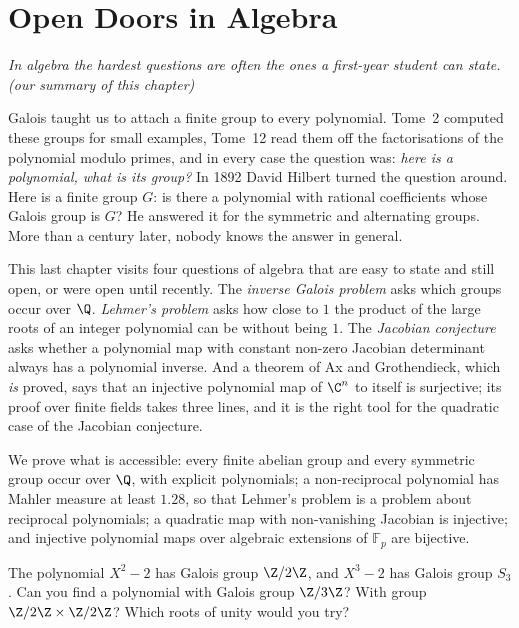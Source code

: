 \chapter{Open Doors in Algebra}\label{ch:algebra}

\begin{center}\itshape
In algebra the hardest questions are often the ones a first-year student can state.\\
\upshape(our summary of this chapter)
\end{center}

Galois taught us to attach a finite group to every polynomial. Tome~2 computed these groups for small examples, Tome~12 read them off the
factorisations of the polynomial modulo primes, and in every case the question was: \emph{here is a polynomial, what is its group?} In 1892 David Hilbert
turned the question around. Here is a finite group $G$: is there a polynomial with rational coefficients whose Galois group is $G$? He answered it for the
symmetric and alternating groups. More than a century later, nobody knows the answer in general.

This last chapter visits four questions of algebra that are easy to state and still open, or were open until recently. The \emph{inverse Galois problem}
asks which groups occur over $\Q$. \emph{Lehmer's problem} asks how close to $1$ the product of the large roots of an integer polynomial can be without being
$1$. The \emph{Jacobian conjecture} asks whether a polynomial map with constant non-zero Jacobian determinant always has a polynomial inverse. And a
theorem of Ax and Grothendieck, which \emph{is} proved, says that an injective polynomial map of $\C^n$ to itself is surjective; its proof over finite
fields takes three lines, and it is the right tool for the quadratic case of the Jacobian conjecture.

We prove what is accessible: every finite abelian group and every symmetric group occur over $\Q$, with explicit polynomials; a non-reciprocal polynomial
has Mahler measure at least $1.28$, so that Lehmer's problem is a problem about reciprocal polynomials; a quadratic map with non-vanishing Jacobian is
injective; and injective polynomial maps over algebraic extensions of $\mathbb F_p$ are bijective.

\begin{think}
The polynomial $X^2-2$ has Galois group $\Z/2\Z$, and $X^3-2$ has Galois group $S_3$. Can you find a polynomial with Galois group $\Z/3\Z$? With group
$\Z/2\Z\times\Z/2\Z$? Which roots of unity would you try?
\end{think}

